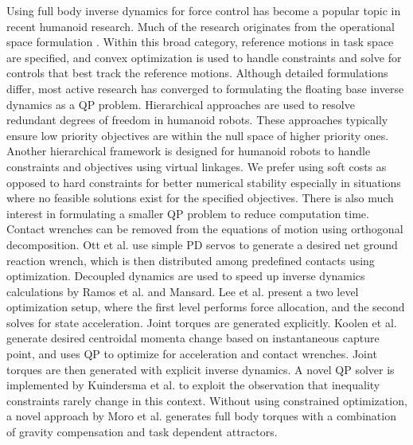 \documentclass{ws-ijhr}
\begin{document}
Using full body inverse dynamics for force control has become a popular topic
in recent humanoid research. Much of the research originates from the 
operational space formulation \cite{khatib_op_space_ctrl}. 
Within this broad category, reference motions in task space are specified, 
and convex optimization is used to handle constraints and solve for controls
that best track the reference motions. 
Although detailed formulations differ, most active research has converged to 
formulating the floating base inverse dynamics as a QP problem. 
Hierarchical approaches \cite{eth_id,Hutter01052014,alex_hir,saab_fast_hir_qp,deLasa_hir,wensing_hir}
are used to resolve redundant degrees of freedom in humanoid robots. 
These approaches typically ensure low priority objectives are within the null
space of higher priority ones. 
Another hierarchical framework \cite{sentis_com_virtual_linkage,sentis_wbc} 
is designed for humanoid robots to handle constraints and objectives using 
virtual linkages. 
We prefer using soft costs as opposed to hard constraints for better numerical 
stability especially in situations where no feasible solutions exist for the 
specified objectives.
There is also much interest in formulating a smaller QP problem to reduce 
computation time. Contact wrenches can be removed from the
equations of motion using orthogonal decomposition. \cite{usc_id1}
Ott et al. \cite{ott_force_alloc} use simple PD servos to generate a 
desired net ground reaction wrench, which is then distributed among predefined 
contacts using optimization.
Decoupled dynamics are used to speed up inverse dynamics calculations by 
Ramos et al. and Mansard. \cite{ramos_dyn_walking,mansard_decoupled}
Lee et al. \cite{lee_separate_grf} present a two level optimization setup, 
where the first level performs force allocation, and the second solves for 
state acceleration. 
Joint torques are generated explicitly. 
Koolen et al. \cite{ihmc_vrc} generate desired centroidal momenta change based 
on instantaneous capture point, and uses QP to optimize for acceleration and 
contact wrenches. Joint torques are then generated with explicit inverse dynamics. 
A novel QP solver is implemented by Kuindersma et al. \cite{scott_qp} to exploit
the observation that inequality constraints rarely change in this context.
Without using constrained optimization, a novel approach by 
Moro et al. \cite{moro_attractor} generates full body torques with a combination 
of gravity compensation and task dependent attractors.
\end{document}
